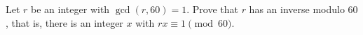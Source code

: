 Let $r$ be an integer with $\gcd(r,60)=1$. Prove that $r$ has an inverse modulo $60$, that is, there is an integer $x$ with $rx\equiv1\pmod{60}$.
